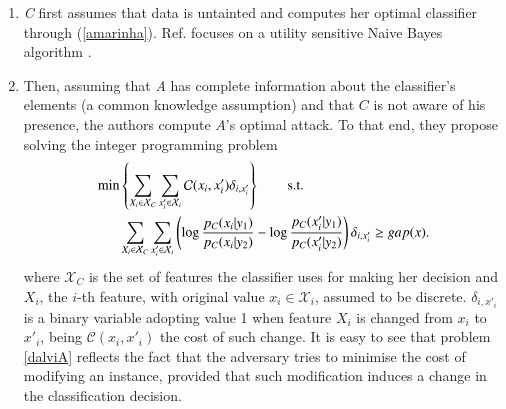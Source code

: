 \begin{enumerate}
\item \textit{C} first assumes that data is untainted and computes her optimal classifier through (\ref{amarinha}).
Ref. \parencite{adversarialClassification2004} focuses on  a utility sensitive Naive Bayes algorithm \parencite{elkan2001foundations}.
\item Then, assuming that \textit{A} has complete information about the classifier's elements (a common knowledge
assumption)
and that $C$ is not aware of his presence, the authors 
compute $A$'s optimal attack. 
To that end, they propose solving the integer programming  problem
\begin{align} \label{dalviA}
    \begin{split}
        \min & \left \lbrace \sum_{X_i \in \mathcal{X}_C} \sum_{x'_i \in \mathcal{X}_i} \mathcal{C}(x_i, x'_i) \delta _{i, x'_i} \right \rbrace\qquad {\rm s.t.} \\
        & \sum_{X_i \in \mathcal{X}_C} \sum_{x'_i \in \mathcal{X}_i} \left ( \log \frac{p_C(x_i|y_1)}{p_C(x_i|y_2)} - \log \frac{p_C(x'_i|y_1)}{p_C(x'_i|y_2)} \right ) \delta _{i, x'_i} \geq gap(x) .
    \end{split}
\end{align}
where $\mathcal{X}_C$ is the set of features the classifier uses for making her decision and $X_i$, the $i$-th feature, with original value $x_i \in \mathcal{X}_i$, assumed to be discrete. %
 $\delta_{i, x'_i}$ is a binary variable adopting value 1 when feature $X_i$ is changed from $x_i$ to $x'_i$, being $\mathcal{C}(x_i, x'_i)$ the cost of such change. 
It is easy to see that problem \eqref{dalviA} reflects the fact that the adversary tries to minimise the cost of modifying an instance, provided that such modification induces a change in the classification decision.


\end{enumerate}
